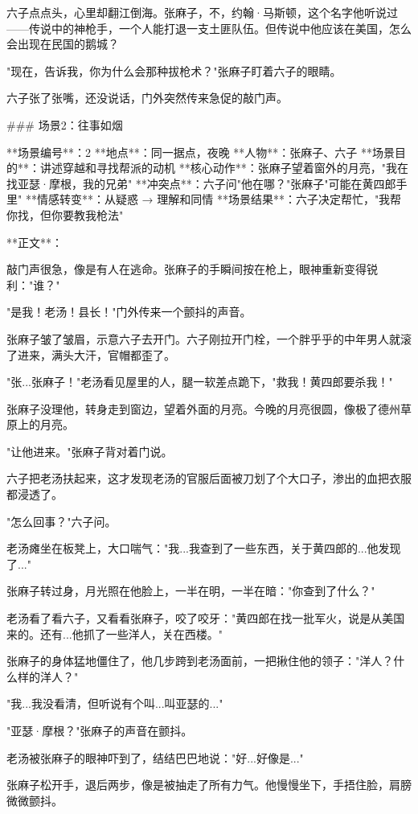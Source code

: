 六子点点头，心里却翻江倒海。张麻子，不，约翰·马斯顿，这个名字他听说过——传说中的神枪手，一个人能打退一支土匪队伍。但传说中他应该在美国，怎么会出现在民国的鹅城？

"现在，告诉我，你为什么会那种拔枪术？"张麻子盯着六子的眼睛。

六子张了张嘴，还没说话，门外突然传来急促的敲门声。

### 场景2：往事如烟

**场景编号**：2  
**地点**：同一据点，夜晚  
**人物**：张麻子、六子  
**场景目的**：讲述穿越和寻找帮派的动机  
**核心动作**：张麻子望着窗外的月亮，"我在找亚瑟·摩根，我的兄弟"  
**冲突点**：六子问"他在哪？"张麻子"可能在黄四郎手里"  
**情感转变**：从疑惑 → 理解和同情  
**场景结果**：六子决定帮忙，"我帮你找，但你要教我枪法"

**正文**：

敲门声很急，像是有人在逃命。张麻子的手瞬间按在枪上，眼神重新变得锐利："谁？"

"是我！老汤！县长！"门外传来一个颤抖的声音。

张麻子皱了皱眉，示意六子去开门。六子刚拉开门栓，一个胖乎乎的中年男人就滚了进来，满头大汗，官帽都歪了。

"张...张麻子！"老汤看见屋里的人，腿一软差点跪下，"救我！黄四郎要杀我！"

张麻子没理他，转身走到窗边，望着外面的月亮。今晚的月亮很圆，像极了德州草原上的月亮。

"让他进来。"张麻子背对着门说。

六子把老汤扶起来，这才发现老汤的官服后面被刀划了个大口子，渗出的血把衣服都浸透了。

"怎么回事？"六子问。

老汤瘫坐在板凳上，大口喘气："我...我查到了一些东西，关于黄四郎的...他发现了..."

张麻子转过身，月光照在他脸上，一半在明，一半在暗："你查到了什么？"

老汤看了看六子，又看看张麻子，咬了咬牙："黄四郎在找一批军火，说是从美国来的。还有...他抓了一些洋人，关在西楼。"

张麻子的身体猛地僵住了，他几步跨到老汤面前，一把揪住他的领子："洋人？什么样的洋人？"

"我...我没看清，但听说有个叫...叫亚瑟的..."

"亚瑟·摩根？"张麻子的声音在颤抖。

老汤被张麻子的眼神吓到了，结结巴巴地说："好...好像是..."

张麻子松开手，退后两步，像是被抽走了所有力气。他慢慢坐下，手捂住脸，肩膀微微颤抖。

